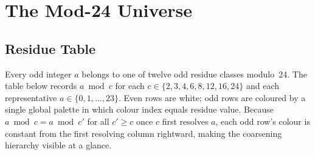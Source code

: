 \documentclass[11pt,a4paper]{article}
\theoremstyle{remark}
\theoremstyle{plain}
\begin{document}
\section{The Mod-24 Universe}
\label{sec:mod24}

\subsection{Residue Table}

Every odd integer $a$ belongs to one of twelve odd residue classes modulo~24.
The table below records $a \bmod c$ for each $c \in \{2,3,4,6,8,12,16,24\}$
and each representative $a \in \{0,1,\ldots,23\}$.
Even rows are white; odd rows are coloured by a single global palette in which
colour index equals residue value.
Because $a \bmod c = a \bmod c'$ for all $c' \geq c$ once $c$ first resolves $a$,
each odd row's colour is constant from the first resolving column rightward,
making the coarsening hierarchy visible at a glance.
\end{document}
